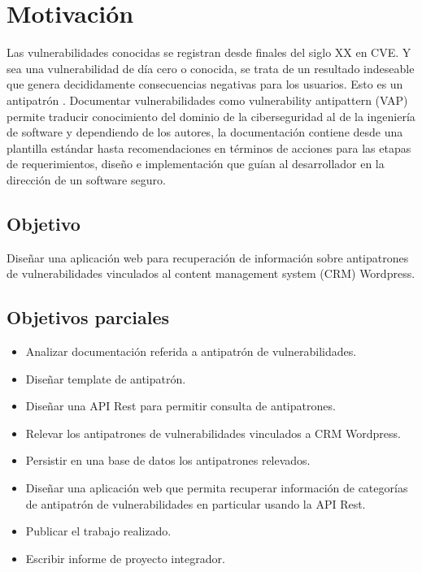 \chapter*{Motivación}
Las vulnerabilidades conocidas se registran desde finales del siglo XX en CVE. Y sea una vulnerabilidad de día cero o conocida, se trata de un resultado indeseable que genera decididamente consecuencias negativas para los usuarios. Esto es un antipatrón \cite{Brown_1998}\cite{Corry_2021}. Documentar vulnerabilidades como vulnerability antipattern (VAP) permite traducir conocimiento del dominio de la ciberseguridad\cite{CYBOK} al de la ingeniería de software\cite{SWEBoK} y dependiendo de los autores, la documentación contiene desde una plantilla estándar hasta recomendaciones en términos de acciones para las etapas de requerimientos, diseño e implementación\cite{Nafees_2019} que guían al desarrollador en la dirección de un software seguro.

\section{Objetivo}

Diseñar una aplicación web para recuperación de información sobre antipatrones de vulnerabilidades vinculados al content management system (CRM) Wordpress.

\section{Objetivos parciales}

\begin{itemize}
    \item Analizar documentación referida a antipatrón de vulnerabilidades.
    \item Diseñar template de antipatrón.
    \item Diseñar una API Rest para permitir consulta de antipatrones.
    \item Relevar los antipatrones de vulnerabilidades vinculados a CRM Wordpress.
    \item Persistir en una base de datos los antipatrones relevados.
    \item Diseñar una aplicación web que permita recuperar información de categorías de antipatrón de vulnerabilidades en particular usando la API Rest.
    \item Publicar el trabajo realizado.
    \item Escribir informe de proyecto integrador.
\end{itemize}

